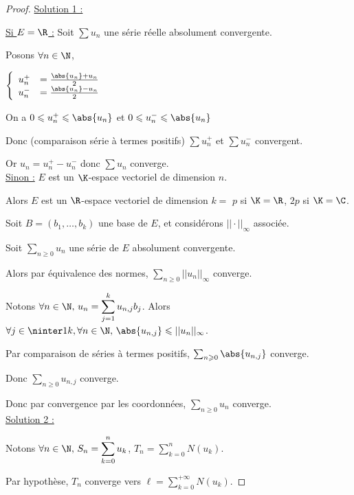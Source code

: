 \begin{proof} 
    \uline{Solution 1 :}

    \uline{Si $E = \R$ :}
    \svspace Soit $\sum u_n$ une série réelle absolument convergente.

    Posons $\forall n \in \N$,

    $\left\{ \begin{array}{rl}
        u_n^+ & = \frac{\abs{u_n} + u_n}{ 2} \\
        u_n^- & = \frac{\abs{u_n} - u_n}{ 2}
    \end{array} \right.$

    On a $0 \leqslant u_n^+ \leqslant \abs{u_n}$ et $0 \leqslant u_n^- \leqslant \abs{u_n}$

    Donc (comparaison série à termes positifs) $\sum u_n^+$ et $\sum u_n^-$ convergent. 

    Or $u_n = u_n^+ - u_n^-$ donc $\sum u_n$ converge. \\

    \uline{Sinon :} $E$ est un $\K$-espace vectoriel de dimension $n$. 
    
    Alors $E$ est un $\R$-espace vectoriel de dimension $k = $ $p$ si $\K = \R$, $2p$ si $\K = \C$.

    Soit $B = (b_1, \ldots, b_k)$ une base de $E$, et considérons $|| \cdot ||_\infty$ associée. 

    Soit $\sum_{n \geqslant 0} u_n$ une série de $E$ absolument convergente.

    Alors par équivalence des normes, $\sum_{n \geqslant 0} || u_n ||_\infty$ converge.

    Notons $\displaystyle \forall n \in \N, \, u_n = \sum_{j = 1}^k u_{n, j} b_j$.
    Alors $\forall j \in \ninter 1 k, \forall n \in \N, \, \abs{u_{n, j}} \leqslant || u_n ||_\infty$.

    Par comparaison de séries à termes positifs, $\sum_{n \geqslant 0} \abs{u_{n, j}}$ converge.

    Donc $\sum_{n \geqslant 0} u_{n, j}$ converge. 

    Donc par convergence par les coordonnées, $\sum_{n \geqslant 0} u_n$ converge. \\

    \uline{Solution 2 :}

    Notons $\displaystyle \forall n \in \N, \, S_n = \sum_{k = 0}^n u_k $, $\displaystyle T_n = \sum_{k = 0}^n N(u_k)$.

    Par hypothèse, $T_n$ converge vers $\displaystyle \ell = \sum_{k = 0}^{+\infty} N(u_k)$.


\end{proof}

